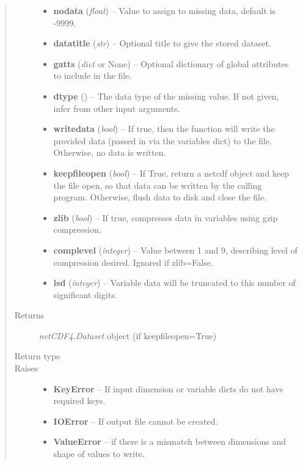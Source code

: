 \documentclass[letterpaper,10pt,english]{sphinxmanual}
\begin{document}
\begin{fulllineitems}
\begin{quote}
\begin{description}
\begin{itemize}
\item {} 
\textbf{nodata} (\emph{float}) -- Value to assign to missing data, default is -9999.

\item {} 
\textbf{datatitle} (\emph{str}) -- Optional title to give the stored dataset.

\item {} 
\textbf{gatts} (\emph{dict} or None) -- Optional dictionary of global attributes to include in the 
file.

\item {} 
\textbf{dtype} () -- The data type of the missing value. If not given, infer from 
other input arguments.

\item {} 
\textbf{writedata} (\emph{bool}) -- If true, then the function will write the provided 
data (passed in via the variables dict) to the file. Otherwise, no data 
is written.

\item {} 
\textbf{keepfileopen} (\emph{bool}) -- If True, return a netcdf object and keep the 
file open, so that data can be written by the calling program. 
Otherwise, flush data to disk and close the file.

\item {} 
\textbf{zlib} (\emph{bool}) -- If true, compresses data in variables using gzip 
compression.

\item {} 
\textbf{complevel} (\emph{integer}) -- Value between 1 and 9, describing level of 
compression desired. Ignored if zlib=False.

\item {} 
\textbf{lsd} (\emph{integer}) -- Variable data will be truncated to this number of 
significant digits.

\end{itemize}

\item[{Returns}] \leavevmode
\emph{netCDF4.Dataset} object (if keepfileopen=True)

\item[{Return type}] \leavevmode
{}

\item[{Raises}] \leavevmode\begin{itemize}
\item {} 
\textbf{KeyError} -- If input dimension or variable dicts do not have required 
keys.

\item {} 
\textbf{IOError} -- If output file cannot be created.

\item {} 
\textbf{ValueError} -- if there is a mismatch between dimensions and shape of 
values to write.

\end{itemize}

\end{description}\end{quote}

\end{fulllineitems}
\end{document}
